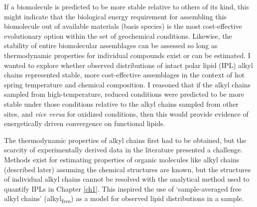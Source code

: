 If a biomolecule is predicted to be more stable relative to others of its kind, this might indicate that the biological energy requirement for assembling this biomolecule out of available materials (basis species) is the most cost-effective evolutionary option within the set of geochemical conditions. Likewise, the stability of entire biomolecular assemblages can be assessed so long as thermodynamic properties for individual compounds exist or can be estimated. I wanted to explore whether observed distributions of intact polar lipid (IPL) alkyl chains represented stable, more cost-effective assemblages in the context of hot spring temperature and chemical composition. I reasoned that if the alkyl chains sampled from high-temperature, reduced conditions were predicted to be more stable under those conditions relative to the alkyl chains sampled from other sites, and \textit{vice versa} for oxidized conditions, then this would provide evidence of energetically driven convergence on functional lipids.

The thermodynamic properties of alkyl chains first had to be obtained, but the scarcity of experimentally derived data in the literature presented a challenge. Methods exist for estimating properties of organic molecules like alkyl chains (described later) assuming the chemical structures are known, but the structures of individual alkyl chains cannot be resolved with the analytical method used to quantify IPLs in Chapter \ref{ch1}. This inspired the use of `sample-averaged free alkyl chains' (alkyl\textsubscript{free}) as a model for observed lipid distributions in a sample.


